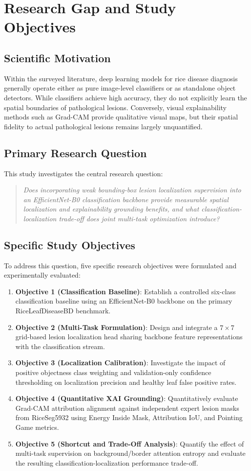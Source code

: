 \section{Research Gap and Study Objectives}
\label{sec:research_gap}

\subsection{Scientific Motivation}
Within the surveyed literature, deep learning models for rice disease diagnosis generally operate either as pure image-level classifiers or as standalone object detectors. While classifiers achieve high accuracy, they do not explicitly learn the spatial boundaries of pathological lesions. Conversely, visual explainability methods such as Grad-CAM provide qualitative visual maps, but their spatial fidelity to actual pathological lesions remains largely unquantified.

\subsection{Primary Research Question}
This study investigates the central research question:
\begin{quote}
\textit{Does incorporating weak bounding-box lesion localization supervision into an EfficientNet-B0 classification backbone provide measurable spatial localization and explainability grounding benefits, and what classification-localization trade-off does joint multi-task optimization introduce?}
\end{quote}

\subsection{Specific Study Objectives}
To address this question, five specific research objectives were formulated and experimentally evaluated:
\begin{enumerate}
    \item \textbf{Objective 1 (Classification Baseline)}: Establish a controlled six-class classification baseline using an EfficientNet-B0 backbone on the primary RiceLeafDiseaseBD benchmark.
    \item \textbf{Objective 2 (Multi-Task Formulation)}: Design and integrate a $7\times 7$ grid-based lesion localization head sharing backbone feature representations with the classification stream.
    \item \textbf{Objective 3 (Localization Calibration)}: Investigate the impact of positive objectness class weighting and validation-only confidence thresholding on localization precision and healthy leaf false positive rates.
    \item \textbf{Objective 4 (Quantitative XAI Grounding)}: Quantitatively evaluate Grad-CAM attribution alignment against independent expert lesion masks from RiceSeg5932 using Energy Inside Mask, Attribution IoU, and Pointing Game metrics.
    \item \textbf{Objective 5 (Shortcut and Trade-Off Analysis)}: Quantify the effect of multi-task supervision on background/border attention entropy and evaluate the resulting classification-localization performance trade-off.
\end{enumerate}
